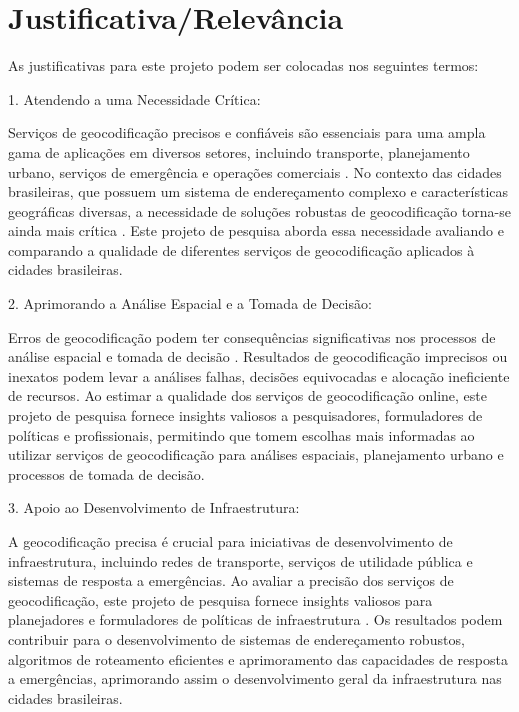 \documentclass{article}
\begin{document}
\section{Justificativa/Relevância}

As justificativas para este projeto podem ser colocadas nos seguintes termos:

1. Atendendo a uma Necessidade Crítica:

Serviços de geocodificação precisos e confiáveis são essenciais para uma ampla gama de aplicações em diversos setores, incluindo transporte, planejamento urbano, serviços de emergência e operações comerciais \cite{kilic2020accuracy,cortes2021improving}. No contexto das cidades brasileiras, que possuem um sistema de endereçamento complexo e características geográficas diversas, a necessidade de soluções robustas de geocodificação torna-se ainda mais crítica  \cite{martins2012geocodificacao,davis2011evaluation}. Este projeto de pesquisa aborda essa necessidade avaliando e comparando a qualidade de diferentes serviços de geocodificação aplicados à cidades brasileiras.

2. Aprimorando a Análise Espacial e a Tomada de Decisão:

Erros de geocodificação podem ter consequências significativas nos processos de análise espacial e tomada de decisão \cite{cortes2021improving}. Resultados de geocodificação imprecisos ou inexatos podem levar a análises falhas, decisões equivocadas e alocação ineficiente de recursos. Ao estimar a qualidade dos serviços de geocodificação online, este projeto de pesquisa fornece insights valiosos a pesquisadores, formuladores de políticas e profissionais, permitindo que tomem escolhas mais informadas ao utilizar serviços de geocodificação para análises espaciais, planejamento urbano e processos de tomada de decisão.

3. Apoio ao Desenvolvimento de Infraestrutura:

A geocodificação precisa é crucial para iniciativas de desenvolvimento de infraestrutura, incluindo redes de transporte, serviços de utilidade pública e sistemas de resposta a emergências. Ao avaliar a precisão dos serviços de geocodificação, este projeto de pesquisa fornece insights valiosos para planejadores e formuladores de políticas de infraestrutura \cite{de2013deployment}. Os resultados podem contribuir para o desenvolvimento de sistemas de endereçamento robustos, algoritmos de roteamento eficientes e aprimoramento das capacidades de resposta a emergências, aprimorando assim o desenvolvimento geral da infraestrutura nas cidades brasileiras.
\end{document}
